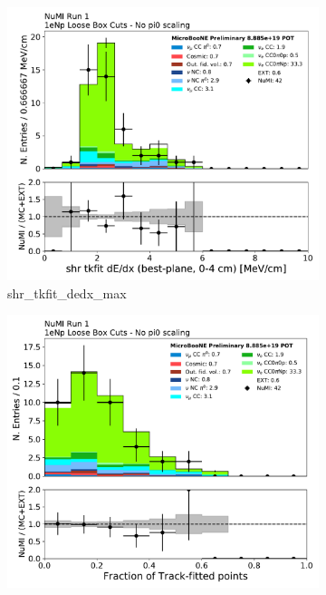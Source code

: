 \begin{figure}[H]
    \centering
    \begin{subfigure}{0.3\textwidth}
    \includegraphics[width=1.0\textwidth]{Sidebands/Figures/NuMI/1eNp/shr_tkfit_dedx_max.pdf}
    \caption{shr\_tkfit\_dedx\_max}
    \end{subfigure}
    \begin{subfigure}{0.3\textwidth}
    \includegraphics[width=1.0\textwidth]{Sidebands/Figures/NuMI/1eNp/trkfit.pdf}

\end{subfigure}
\end{figure}
